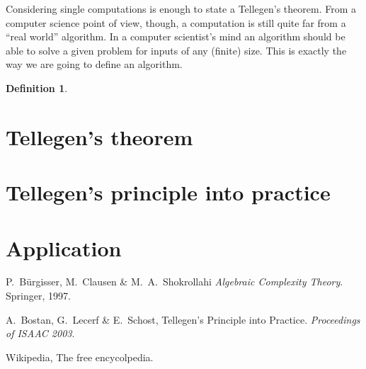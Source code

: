 \documentclass{article}
\newtheorem{definition}{Definition}
\begin{document}
  Considering single computations is enough to state a Tellegen's
  theorem. From a computer science point of view, though, a
  computation is still quite far from a ``real world'' algorithm. In a
  computer scientist's mind an algorithm should be able to solve a
  given problem for inputs of any (finite) size. This is exactly the
  way we are going to define an algorithm.

  \begin{definition}
    
  \end{definition}



  \section{Tellegen's theorem}
  
  \section{Tellegen's principle into practice}
  
  \section{Application}


  
  \begin{thebibliography}{1}
    
  P.~Bürgisser, M.~Clausen \& M.~A.~Shokrollahi
    \emph{Algebraic Complexity Theory}.
    Springer, 1997.
    
  A.~Bostan, G.~Lecerf \& E.~Schost,
    Tellegen's Principle into Practice.
    \emph{Proceedings of ISAAC 2003}.

  Wikipedia, The free encycolpedia.
  
  \end{thebibliography}
\end{document}
